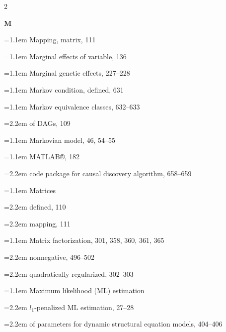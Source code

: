 \begin{multicols}{2}
\par{}\medskip\noindent\textbf{M}\par\nobreak\smallskip\nobreak
\noindent\hangindent=1.1em Mapping, matrix, 111\par
\noindent\hangindent=1.1em Marginal effects of variable, 136\par
\noindent\hangindent=1.1em Marginal genetic effects, 227--228\par
\noindent\hangindent=1.1em Markov condition, defined, 631\par
\noindent\hangindent=1.1em Markov equivalence classes, 632--633\par
\noindent\hangindent=2.2em \hspace*{1.1em}of DAGs, 109\par
\noindent\hangindent=1.1em Markovian model, 46, 54--55\par
\noindent\hangindent=1.1em MATLAB®, 182\par
\noindent\hangindent=2.2em \hspace*{1.1em}code package for causal discovery algorithm, 658--659\par
\noindent\hangindent=1.1em Matrices\par
\noindent\hangindent=2.2em \hspace*{1.1em}defined, 110\par
\noindent\hangindent=2.2em \hspace*{1.1em}mapping, 111\par
\noindent\hangindent=1.1em Matrix factorization, 301, 358, 360, 361, 365\par
\noindent\hangindent=2.2em \hspace*{1.1em}nonnegative, 496--502\par
\noindent\hangindent=2.2em \hspace*{1.1em}quadratically regularized, 302--303\par
\noindent\hangindent=1.1em Maximum likelihood (ML) estimation\par
\noindent\hangindent=2.2em \hspace*{1.1em}$l_{1}$-penalized ML estimation, 27--28\par
\noindent\hangindent=2.2em \hspace*{1.1em}of parameters for dynamic structural equation models, 404--406\par

\end{multicols}
